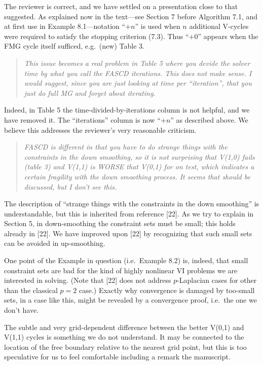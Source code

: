 \documentclass[letterpaper,final,12pt,reqno]{amsart}
\newenvironment{review}%
{\bigskip \par \begin{quote} \selectfont \sl}%
{\end{quote}}
\newcommand\short[1]{\medskip\noindent #1}   %
\newenvironment{response}%
{\medskip\noindent}%
{}
\begin{document}
\short{The reviewer is correct, and we have settled on a presentation close to that suggested.  As explained now in the text---see Section 7 before Algorithm 7.1, and at first use in Example 8.1---notation ``$+n$'' is used when $n$ additional V-cycles were required to satisfy the stopping criterion (7.3).  Thus ``$+0$'' appears when the FMG cycle itself sufficed, e.g.~(new) Table 3. }


\begin{review}
This issue becomes a real problem in Table 5 where you devide the solver time by what you call the FASCD iterations.  This does not make sense. I would suggest, since you are just looking at time per ``iteration'', that you just do full MG and forget about iterating.
\end{review}

\short{Indeed, in Table 5 the time-divided-by-iterations column is not helpful, and we have removed it.  The ``iterations'' column is now ``$+n$'' as described above.  We believe this addresses the reviewer's very reasonable criticism.}

\begin{review}
FASCD is different in that you have to do strange things with the constraints in the down smoothing, so it is not surprising that V(1,0) fails (table 3) and V(1,1) is WORSE that V(0,1) for on test, which indicates a certain fragility with the down smoothing process. It seems that should be discussed, but I don't see this.
\end{review}

\begin{response}
The description of ``strange things with the constraints in the down smoothing'' is understandable, but this is inherited from reference [22].  As we try to explain in Section 5, in down-smoothing the constraint sets must be small; this holds already in [22].  We have improved upon [22] by recognizing that such small sets can be avoided in up-smoothing.

One point of the Example in question (i.e.~Example 8.2) is, indeed, that small constraint sets are bad for the kind of highly nonlinear VI problems we are interested in solving.  (Note that [22] does not address $p$-Laplacian cases for other than the classical $p=2$ case.)  Exactly why convergence is damaged by too-small sets, in a case like this, might be revealed by a convergence proof, i.e.~the one we don't have.

The subtle and very grid-dependent difference between the better V(0,1) and V(1,1) cycles is something we do not understand.  It may be connected to the location of the free boundary relative to the nearest grid point, but this is too speculative for us to feel comfortable including a remark the manuscript.
\end{response}
\end{document}
